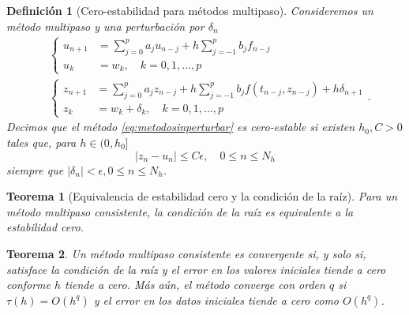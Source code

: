 \documentclass[11pt,letterpaper]{article}
\newtheorem{definition}{Definición}
\newtheorem{theorem}{Teorema}
\begin{document}
\begin{definition}[Cero-estabilidad para métodos multipaso]
  Consideremos un método multipaso y una perturbación por
  $\delta_{n}$
  \begin{align}
    &\left\{
      \begin{aligned}
        u_{n+1}
        &= \sum_{j=0}^{p}a_ju_{n-j}
        + h \sum_{j=-1}^{p} b_jf_{n-j} \\
        u_k &= w_k, \quad k=0,1,\dots,p
      \end{aligned}
    \right.
    \label{eq:metodosinperturbar}
    \\
    &\left\{
      \begin{aligned}
        z_{n+1}
        &= \sum_{j=0}^{p}a_jz_{n-j}
        + h \sum_{j=-1}^{p} b_jf(t_{n-j},z_{n-j}) + h\delta_{n+1} \\
        z_k &= w_k + \delta_k, \quad k=0,1,\dots,p
      \end{aligned}
    \right.
  .\end{align}
  Decimos que el método \eqref{eq:metodosinperturbar}  
  es cero-estable si existen $h_0,C>0$ tales
  que, para $h\in(0,h_0]$
  \begin{equation}
    |z_n-u_n|\leq C\epsilon, \quad 0\leq n\leq N_h
  \end{equation}
  siempre que $|\delta_n|<\epsilon, 0\leq n\leq N_h$.
\end{definition}

\begin{theorem}[Equivalencia de estabilidad cero y la condición de la
  raíz]
  Para un método multipaso consistente, la condición de la raíz es
  equivalente a la estabilidad cero.
\end{theorem}

\begin{theorem}
  Un método multipaso consistente es convergente si, y solo si,
  satisface la condición de la raíz y el error en los valores
  iniciales tiende a cero conforme $h$ tiende a cero. Más aún, el
  método converge con orden $q$ si $\tau(h)=O(h^q)$ y el error en los
  datos iniciales tiende a cero como $O(h^q)$.
\end{theorem}
\end{document}
